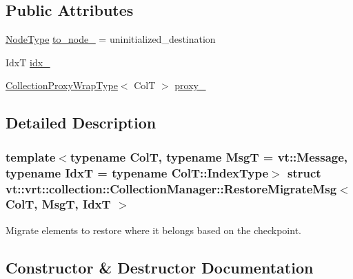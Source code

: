 \subsection*{Public Attributes}
\begin{DoxyCompactItemize}
\item 
\hyperlink{namespacevt_a866da9d0efc19c0a1ce79e9e492f47e2}{Node\+Type} \hyperlink{structvt_1_1vrt_1_1collection_1_1_collection_manager_1_1_restore_migrate_msg_a761dcd3e0734070eb65d99990cc99081}{to\+\_\+node\+\_\+} = uninitialized\+\_\+destination
\item 
IdxT \hyperlink{structvt_1_1vrt_1_1collection_1_1_collection_manager_1_1_restore_migrate_msg_a3c90515d657d0e462f4bf08f07baa43a}{idx\+\_\+}
\item 
\hyperlink{structvt_1_1vrt_1_1collection_1_1_collection_manager_a56458ed7f9bb22b631b9b3a745f42f94}{Collection\+Proxy\+Wrap\+Type}$<$ ColT $>$ \hyperlink{structvt_1_1vrt_1_1collection_1_1_collection_manager_1_1_restore_migrate_msg_a7c22fe526d60f1209cb156721afc01ba}{proxy\+\_\+}
\end{DoxyCompactItemize}


\subsection{Detailed Description}
\subsubsection*{template$<$typename ColT, typename MsgT = vt\+::\+Message, typename IdxT = typename Col\+T\+::\+Index\+Type$>$\newline
struct vt\+::vrt\+::collection\+::\+Collection\+Manager\+::\+Restore\+Migrate\+Msg$<$ Col\+T, Msg\+T, Idx\+T $>$}

Migrate elements to restore where it belongs based on the checkpoint. 



\subsection{Constructor \& Destructor Documentation}
\mbox{\label{structvt_1_1vrt_1_1collection_1_1_collection_manager_1_1_restore_migrate_msg_ac4dbb8856fdb35a40e2cdebbff085a7e}} 
